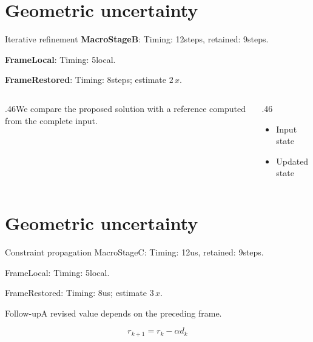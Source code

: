 \documentclass[10pt,aspectratio=169]{beamer}
\newcommand{\fuzzlayerA}[1]{\textbf{#1}}
\newcommand{\fuzzlayerB}[1]{\fuzzlayerA{#1}}
\newcommand{\fuzzlayerC}[1]{\fuzzlayerB{#1}}
\newcommand{\fuzzterm}[1]{\fuzzlayerC{#1}}
\newcommand{\fuzzpair}[2]{\fuzzterm{#1}: #2}
\newcommand{\fuzzunit}{steps}
\let\fuzzoriginalunit\fuzzunit
\newcommand{\fuzzcoefficient}{2}
\newcommand{\fuzzscale}[2][\fuzzcoefficient]{#1\,#2}
\begin{document}
\section{Geometric uncertainty}
\begin{frame}[t]{Iterative refinement}
\fuzzpair{MacroStageB}{Timing: 12\fuzzunit, retained: 9\fuzzoriginalunit.}\par
{\renewcommand{\fuzzunit}{local}\fuzzpair{FrameLocal}{Timing: 5\fuzzunit.}\par}
\fuzzpair{FrameRestored}{Timing: 8\fuzzunit; estimate $\fuzzscale{x}$.}\par
\begin{columns}[T]\begin{column}{.46\textwidth}We compare the proposed solution with a reference computed from the complete input.\end{column}\begin{column}{.46\textwidth}\begin{itemize}\item Input state\item Updated state\end{itemize}\end{column}\end{columns}
\end{frame}
\renewcommand{\fuzzunit}{us}
\renewcommand{\fuzzcoefficient}{3}
\renewcommand{\fuzzterm}[1]{{\textrm{#1}}}
\section{Geometric uncertainty}
\begin{frame}[t]{Constraint propagation}
\fuzzpair{MacroStageC}{Timing: 12\fuzzunit, retained: 9\fuzzoriginalunit.}\par
{\renewcommand{\fuzzunit}{local}\fuzzpair{FrameLocal}{Timing: 5\fuzzunit.}\par}
\fuzzpair{FrameRestored}{Timing: 8\fuzzunit; estimate $\fuzzscale{x}$.}\par
\begin{block}{Follow-up}\fuzzterm{A revised value} depends on the preceding frame.\end{block}
\[r_{k+1}=r_k-\alpha d_k\]
\end{frame}
\end{document}
